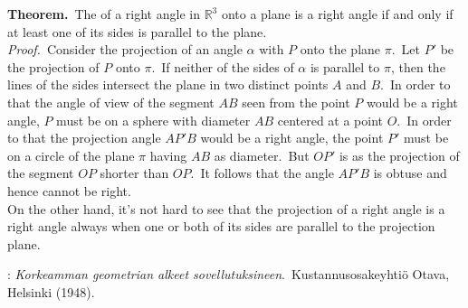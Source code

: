 \documentclass[12pt]{article}
\theoremstyle{definition}
\begin{document}
  

\textbf{Theorem.}\, The  of a right angle in $\mathbb{R}^3$ onto a plane is a right angle if and only if at least one of its sides is parallel to the plane.\\

\emph{Proof.}\, Consider the projection of an angle $\alpha$ with  $P$ onto the plane $\pi$.\, Let $P'$ be the projection of $P$ onto $\pi$.\, If neither of the sides of $\alpha$ is parallel to $\pi$, then the lines of the sides intersect the plane in two distinct points $A$ and $B$.\, In order to that the angle of view of the segment $AB$ seen from the point $P$ would be a right angle, $P$ must be on a sphere with diameter $AB$ centered at a point $O$.\, In order to that the projection angle $AP'B$ would be a right angle, the point $P'$ must be on a circle of the plane $\pi$ having $AB$  as diameter.\, But $OP'$ is as the projection of the segment $OP$ shorter than $OP$.\, It follows that the angle $AP'B$ is obtuse and hence cannot be right.\\
On the other hand, it's not hard to see that the projection of a right angle is a right angle always when one or both of its sides are parallel to the projection plane.


\begin{thebibliography}{9}
: {\em Korkeamman geometrian alkeet sovellutuksineen}.\, Kustannusosakeyhti\"o Otava, Helsinki (1948).
\end{thebibliography}

\end{document}

